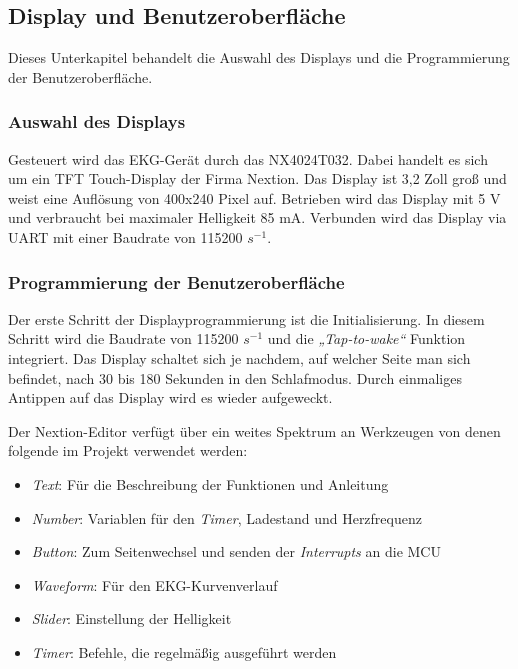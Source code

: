 
\subsection{Display und Benutzeroberfläche}

Dieses Unterkapitel behandelt die Auswahl des Displays und die Programmierung der Benutzeroberfläche.

\subsubsection{Auswahl des Displays}
Gesteuert wird das EKG-Gerät durch das NX4024T032. Dabei handelt es sich um ein TFT Touch-Display der Firma Nextion. Das Display ist 3,2 Zoll groß und weist eine Auflösung von 400x240 Pixel auf. Betrieben wird das Display mit 5 V und verbraucht bei maximaler Helligkeit 85 mA. Verbunden wird das Display via UART mit einer Baudrate von 115200 $s^{-1}$.

\subsubsection{Programmierung der Benutzeroberfläche}
Der erste Schritt der Displayprogrammierung ist die Initialisierung. In diesem Schritt wird die Baudrate von 115200 $s^{-1}$ und die \textit{„Tap-to-wake“} Funktion integriert. Das Display schaltet sich je nachdem, auf welcher Seite man sich befindet, nach 30 bis 180 Sekunden in den Schlafmodus. Durch einmaliges Antippen auf das Display wird es wieder aufgeweckt.

Der Nextion-Editor verfügt über ein weites Spektrum an Werkzeugen von denen folgende im Projekt verwendet werden:
\begin{itemize}
    \item \textit{Text}: Für die Beschreibung der Funktionen und Anleitung
    \item \textit{Number}: Variablen für den \textit{Timer}, Ladestand und Herzfrequenz
    \item \textit{Button}: Zum Seitenwechsel und senden der \textit{Interrupts} an die MCU
    \item \textit{Waveform}: Für den EKG-Kurvenverlauf
    \item \textit{Slider}: Einstellung der Helligkeit
    \item \textit{Timer}: Befehle, die regelmäßig ausgeführt werden
\end{itemize}

